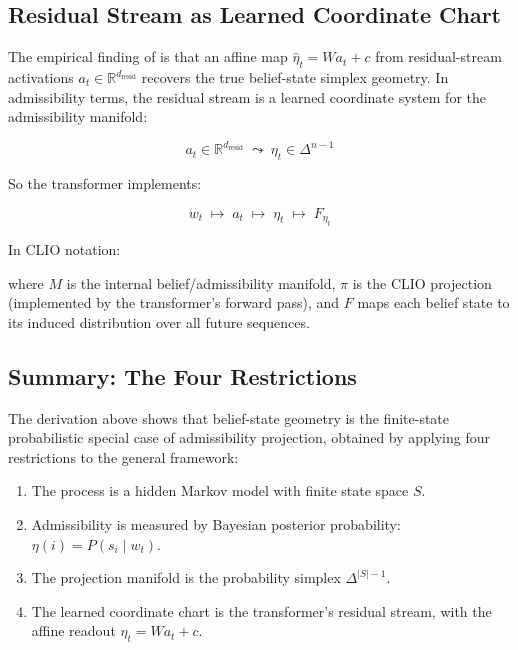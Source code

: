 \documentclass[12pt, a4paper]{article}
\theoremstyle{plain}
\theoremstyle{definition}
\theoremstyle{remark}
\begin{document}
\begin{center}
\end{center}

\subsection{Residual Stream as Learned Coordinate Chart}

The empirical finding of \citet{shai2025} is that an affine map
$\hat{\eta}_t = W a_t + c$ from residual-stream activations $a_t \in
\mathbb{R}^{d_\text{resid}}$ recovers the true belief-state simplex geometry.
In admissibility terms, the residual stream is a learned coordinate system
for the admissibility manifold:

$$a_t \in \mathbb{R}^{d_\text{resid}} \;\leadsto\; \eta_t \in \Delta^{n-1}$$

So the transformer implements:

$$w_t \;\longmapsto\; a_t \;\longmapsto\; \eta_t \;\longmapsto\; F_{\eta_t}$$

In CLIO notation:

\begin{center}
\end{center}

where $M$ is the internal belief/admissibility manifold, $\pi$ is the CLIO
projection (implemented by the transformer's forward pass), and $F$ maps
each belief state to its induced distribution over all future sequences.

\subsection{Summary: The Four Restrictions}

The derivation above shows that belief-state geometry is the finite-state
probabilistic special case of admissibility projection, obtained by applying
four restrictions to the general framework:

\begin{enumerate}[leftmargin=*, label=(\roman*)]
\item The process is a hidden Markov model with finite state space $S$.
\item Admissibility is measured by Bayesian posterior probability: $\eta(i) =
P(s_i \mid w_t)$.
\item The projection manifold is the probability simplex $\Delta^{|S|-1}$.
\item The learned coordinate chart is the transformer's residual stream,
with the affine readout $\hat{\eta}_t = W a_t + c$.
\end{enumerate}
\end{document}
